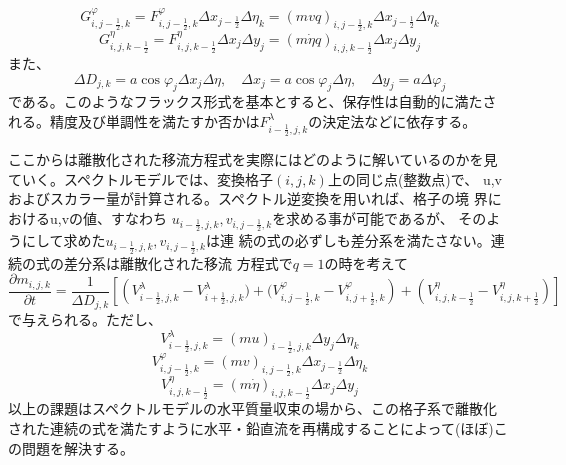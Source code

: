 \documentclass{jsbook}
\begin{document}
\begin{equation}
  G^{\varphi}_{i,j-\frac{1}{2},k}=F^{\varphi}_{i,j-\frac{1}{2},k} \Delta x_{j-\frac{1}{2}} \Delta \eta_{k}=(mvq)_{i,j-\frac{1}{2},k} \Delta x_{j-\frac{1}{2}} \Delta \eta_{k}
\end{equation}
\begin{equation}
  G^{\eta}_{i,j,k-\frac{1}{2}}=F^{\eta}_{i,j,k-\frac{1}{2}} \Delta x_{j} \Delta y_{j}=(m \dot{\eta} q)_{i,j,k-\frac{1}{2}} \Delta x_{j} \Delta y_{j}
\end{equation}
また、
\begin{equation}
  \Delta D_{j,k}=a \cos \varphi_{j} \Delta x_{j} \Delta \eta,\quad \Delta x_{j}=a \cos \varphi_{j} \Delta \eta,\quad \Delta y_{j}=a \Delta \varphi_{j}
\end{equation}
である。このようなフラックス形式を基本とすると、保存性は自動的に満たさ
れる。精度及び単調性を満たすか否かは$F^{\lambda}_{i-\frac{1}{2},j,k}$の決定法などに依存する。

ここからは離散化された移流方程式を実際にはどのように解いているのかを見
ていく。スペクトルモデルでは、変換格子$(i,j,k)$上の同じ点(整数点)で、
u,vおよびスカラー量が計算される。スペクトル逆変換を用いれば、格子の境
界におけるu,vの値、すなわち
$u_{i-\frac{1}{2},j,k},v_{i,j-\frac{1}{2},k}$を求める事が可能であるが、
そのようにして求めた$u_{i-\frac{1}{2},j,k},v_{i,j-\frac{1}{2},k}$は連
続の式の必ずしも差分系を満たさない。連続の式の差分系は離散化された移流
方程式で$q=1$の時を考えて
\begin{equation}
  \frac{\partial m_{i,j,k} }{\partial t}=\frac{1}{\Delta D_{j,k}}\left[\left(V^{\lambda}_{i-\frac{1}{2},j,k}-V^{\lambda}_{i+\frac{1}{2},j,k})+(V^{\varphi}_{i,j-\frac{1}{2},k}-V^{\varphi}_{i,j+\frac{1}{2},k}\right)+\left(V^{\eta}_{i,j,k-\frac{1}{2}}-V^{\eta}_{i,j,k+\frac{1}{2}}\right)\right]
\end{equation}
で与えられる。ただし、
\begin{equation}
  V^{\lambda}_{i-\frac{1}{2},j,k}=(mu)_{i-\frac{1}{2},j,k} \Delta y_{j} \Delta \eta_{k}
\end{equation}
\begin{equation}
  V^{\varphi}_{i,j-\frac{1}{2},k}=(mv)_{i,j-\frac{1}{2},k} \Delta x_{j-\frac{1}{2}} \Delta \eta_{k}
\end{equation}
\begin{equation}
  V^{\eta}_{i,j,k-\frac{1}{2}}=(m\dot{\eta})_{i,j,k-\frac{1}{2}} \Delta x_{j} \Delta y_{j}
\end{equation}
以上の課題はスペクトルモデルの水平質量収束の場から、この格子系で離散化
された連続の式を満たすように水平・鉛直流を再構成することによって(ほぼ)この問題を解決する。
\end{document}
